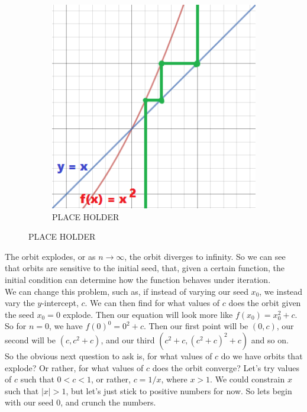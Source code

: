 \documentclass[20pt]{article} %
\begin{document}
\begin{figure}[!htbp]
  	\centering
   	\begin{subfigure}[p]{0.5\linewidth}
    	\includegraphics[width=\linewidth]{./figures/fp_1-1.png}
	\caption{PLACE HOLDER}
   	\end{subfigure}
\end{figure}

The orbit explodes, or as $n\rightarrow \infty$, the orbit diverges to infinity.  So we can see that orbits are sensitive to the initial seed, that, given a certain function, the initial condition can determine how the function behaves under iteration. \\

We can change this problem, such as, if instead of varying our seed $x_0$, we instead vary the $y$-intercept, $c$.  We can then find for what values of $c$ does the orbit given the seed $x_0 = 0$ explode.  Then our equation will look more like $f(x_0) = x_0^{2} + c$. So for $n=0$, we have $f(0)^{0} = 0^{2} + c$.  Then our first point will be $(0, c)$, our second will be
$(c, c^2 + c)$, and our third $(c^{2}+c, (c^{2}+c)^{2}+c)$ and so on. \\

So the obvious next question to ask is, for what values of $c$ do we have orbits that explode? Or rather, for what values of $c$ does the orbit converge? Let's try values of $c$ such that $0 < c < 1$, or rather, $c = 1/x$, where $x > 1$. We could constrain $x$ such that $|x| > 1$, but let's just stick to positive numbers for now. So lets begin with our seed 0, and crunch the numbers. 
\end{document}
